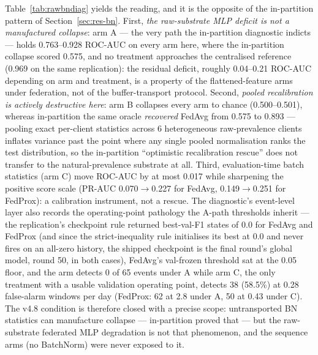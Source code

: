 Table~\ref{tab:rawbndiag} yields the reading, and it is the opposite
of the in-partition pattern of Section~\ref{sec:res-bn}. First,
\emph{the raw-substrate MLP deficit is not a manufactured collapse}:
arm A --- the very path the in-partition diagnostic indicts --- holds
0.763--0.928 ROC-AUC on every arm here, where the in-partition
collapse scored 0.575, and no treatment approaches the centralised
reference (0.969 on the same replication): the residual deficit,
roughly 0.04--0.21 ROC-AUC depending on arm and treatment, is a
property of the flattened-feature arms under federation, not of the
buffer-transport protocol. Second, \emph{pooled recalibration is
actively destructive here}: arm B collapses every arm to chance
(0.500--0.501), whereas in-partition the same oracle \emph{recovered}
FedAvg from 0.575 to 0.893 --- pooling exact per-client statistics
across 6 heterogeneous raw-prevalence clients inflates variance past
the point where any single pooled normalisation ranks the test
distribution, so the in-partition ``optimistic recalibration rescue''
does not transfer to the natural-prevalence substrate at all. Third,
evaluation-time batch statistics (arm C) move ROC-AUC by at most
0.017 while sharpening the positive score scale (PR-AUC
0.070$\to$0.227 for FedAvg, 0.149$\to$0.251 for FedProx): a
calibration instrument, not a rescue. The diagnostic's event-level
layer also records the operating-point pathology the A-path
thresholds inherit --- the replication's checkpoint rule returned
best-val-F1 states of 0.0 for FedAvg and FedProx (and since the
strict-inequality rule initialises its best at 0.0 and never fires on
an all-zero history, the shipped checkpoint is the final round's
global model, round 50, in both cases), FedAvg's val-frozen
threshold sat at the 0.05 floor, and the arm detects 0 of 65 events
under A while arm C, the only treatment with a usable validation
operating point, detects 38 (58.5\%) at 0.28 false-alarm windows per
day (FedProx: 62 at 2.8 under A, 50 at 0.43 under C). The v4.8
condition is therefore closed with a precise scope: untransported BN
statistics can manufacture collapse --- in-partition proved that ---
but the raw-substrate federated MLP degradation is not that
phenomenon, and the sequence arms (no BatchNorm) were never exposed
to it.

